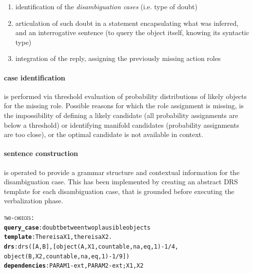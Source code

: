 \documentclass[oribibl]{llncs}
\begin{document}
\begin{enumerate} %
    \item identification of the \textit{disambiguation cases}  (i.e. type of doubt)\\
    \item articulation of such doubt in a statement encapsulating what was inferred, and an interrogative sentence (to query the object itself, knowing its syntactic type) \\ 
    \item integration of the reply, assigning the previously missing action roles 
\end{enumerate}

\paragraph{case identification} is performed via threshold evaluation of probability distributions of likely objects for the missing role. 
Possible reasons for which the role assignment is missing, is the impossibility of 
defining a likely candidate (all probability assignments are below a threshold) or identifying manifold candidates (probability assignments are too close), or
the optimal candidate is not available in context.  

\paragraph{sentence construction} is operated to provide a grammar structure and contextual information for the disambiguation case. This has been implemented by creating an 
abstract DRS template for each disambiguation case, that is grounded 
before executing the verbalization phase. 
\begin{alltt}
{\large \textsc{two-choices}}:
    \textbf{query_case}: doubt between two plausible objects
    \textbf{template}: There is a X1, there is a X2.
    \textbf{drs}: drs([A,B],[object(A,X1,countable,na,eq,1)-1/4,
    object(B,X2,countable,na,eq,1)-1/9])
    \textbf{dependencies}: PARAM1-ext, PARAM2-ext; X1, X2
\end{alltt} 
\end{document}
